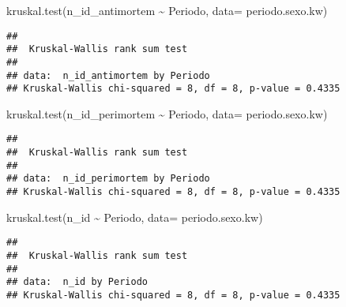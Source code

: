 \documentclass[
]{article}
\newenvironment{Shaded}{\begin{snugshade}}{\end{snugshade}}
\newcommand{\AttributeTok}[1]{\textcolor[rgb]{0.77,0.63,0.00}{#1}}
\newcommand{\FunctionTok}[1]{\textcolor[rgb]{0.00,0.00,0.00}{#1}}
\newcommand{\NormalTok}[1]{#1}
\newcommand{\SpecialCharTok}[1]{\textcolor[rgb]{0.00,0.00,0.00}{#1}}
\begin{document}
\begin{Shaded}
\begin{Highlighting}[]
\FunctionTok{kruskal.test}\NormalTok{(n\_id\_antimortem }\SpecialCharTok{\textasciitilde{}}\NormalTok{ Periodo, }\AttributeTok{data=}\NormalTok{ periodo.sexo.kw)}
\end{Highlighting}
\end{Shaded}

\begin{verbatim}
## 
##  Kruskal-Wallis rank sum test
## 
## data:  n_id_antimortem by Periodo
## Kruskal-Wallis chi-squared = 8, df = 8, p-value = 0.4335
\end{verbatim}

\begin{Shaded}
\begin{Highlighting}[]
\FunctionTok{kruskal.test}\NormalTok{(n\_id\_perimortem }\SpecialCharTok{\textasciitilde{}}\NormalTok{ Periodo, }\AttributeTok{data=}\NormalTok{ periodo.sexo.kw)}
\end{Highlighting}
\end{Shaded}

\begin{verbatim}
## 
##  Kruskal-Wallis rank sum test
## 
## data:  n_id_perimortem by Periodo
## Kruskal-Wallis chi-squared = 8, df = 8, p-value = 0.4335
\end{verbatim}

\begin{Shaded}
\begin{Highlighting}[]
\FunctionTok{kruskal.test}\NormalTok{(n\_id }\SpecialCharTok{\textasciitilde{}}\NormalTok{ Periodo, }\AttributeTok{data=}\NormalTok{ periodo.sexo.kw)}
\end{Highlighting}
\end{Shaded}

\begin{verbatim}
## 
##  Kruskal-Wallis rank sum test
## 
## data:  n_id by Periodo
## Kruskal-Wallis chi-squared = 8, df = 8, p-value = 0.4335
\end{verbatim}

\begin{Shaded}
\end{Shaded}
\end{document}
